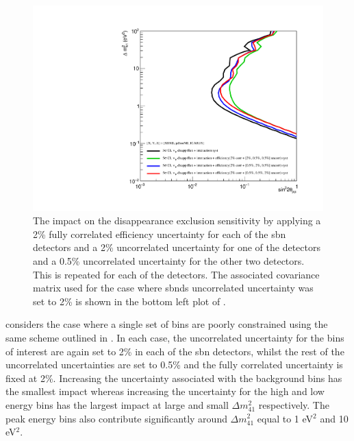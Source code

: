 \begin{figure}[!h]
    \centering
    \includegraphics[width = \largefigwidth]{figures-chap6/exclusion_contours/efficiency_systematics/numu_disapp_2pct_cor_2pct_X_05pct_other_per_detector_uncor.pdf}
    \caption[Impact of a 2\% uncorrelated efficiency systematic for one detector and 0.5\% for the other two on the \numu disappearance channel.]{The impact on the \numu disappearance exclusion sensitivity by applying a 2\% fully correlated efficiency uncertainty for each of the \gls{sbn} detectors and a 2\% uncorrelated uncertainty for one of the detectors and a 0.5\% uncorrelated uncertainty for the other two detectors. This is repeated for each of the detectors. The associated covariance matrix used for the case where \glspl{sbnd} uncorrelated uncertainty was set to 2\% is shown in the bottom left plot of .}
    \label{fig:numu_uncorr}
\end{figure}

\newpage
 considers the case where a single set of bins are poorly constrained using the same scheme outlined in . In each case, the uncorrelated uncertainty for the bins of interest are again set to 2\% in each of the \gls{sbn} detectors, whilst the rest of the uncorrelated uncertainties are set to 0.5\% and the fully correlated uncertainty is fixed at 2\%. Increasing the uncertainty associated with the background bins has the smallest impact whereas increasing the uncertainty for the high and low energy bins has the largest impact at large and small $\Delta m^2_{41}$ respectively. The peak energy bins also contribute significantly around $\Delta m^2_{41}$ equal to 1 eV$^2$ and 10 eV$^2$. 


